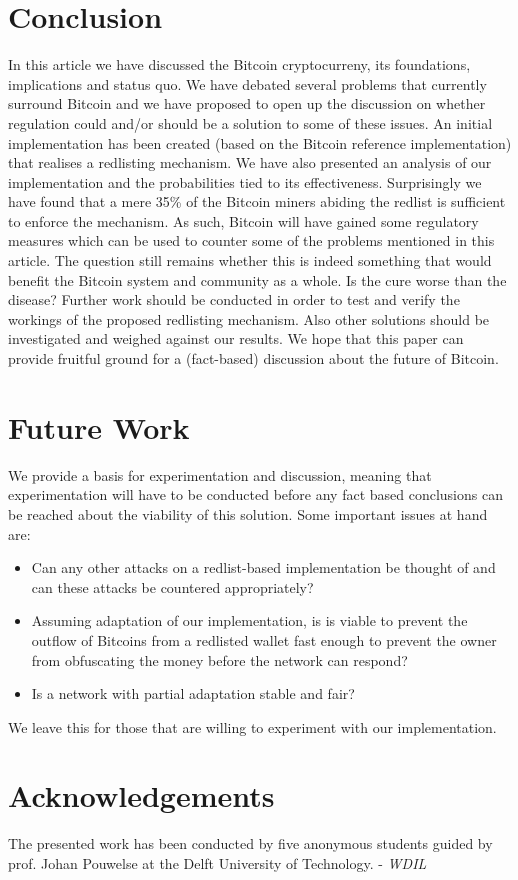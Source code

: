 \documentclass[12pt,journal,compsoc]{IEEEtran}
\begin{document}
\section{Conclusion}
In this article we have discussed the Bitcoin cryptocurreny, its foundations, implications and status quo.
We have debated several problems that currently surround Bitcoin and we have proposed to open up the discussion
on whether regulation could and/or should be a solution to some of these issues. An initial implementation
has been created (based on the Bitcoin reference implementation) that realises a redlisting mechanism.
We have also presented an analysis of our implementation and the probabilities tied to its effectiveness.
Surprisingly we have found that a mere 35\% of the Bitcoin miners abiding the redlist is sufficient to enforce
the mechanism. As such, Bitcoin will have gained some regulatory measures which can be used to counter some of the
problems mentioned in this article. The question still remains whether this is indeed something
that would benefit the Bitcoin system and community as a whole. Is the cure worse than the disease?
Further work should be conducted in order to test and verify the workings of the proposed redlisting mechanism.
Also other solutions should be investigated and weighed against our results. We hope that this paper can provide
fruitful ground for a (fact-based) discussion about the future of Bitcoin.

\section{Future Work}
We provide a basis for experimentation and discussion, meaning that experimentation will have to be
conducted before any fact based conclusions can be reached about the viability of this solution.
Some important issues at hand are:

\begin{itemize}
  \item Can any other attacks on a redlist-based implementation be thought of and can these attacks
    be countered appropriately?
  \item Assuming adaptation of our implementation, is is viable to prevent the outflow of Bitcoins
    from a redlisted wallet fast enough to prevent the owner from obfuscating the money before the
    network can respond?
  \item Is a network with partial adaptation stable and fair?
\end{itemize}

We leave this for those that are willing to experiment with our implementation.

\section{Acknowledgements}
The presented work has been conducted by five anonymous students guided by prof. Johan Pouwelse at the Delft University of Technology. - \emph{WDIL}



\end{document}
